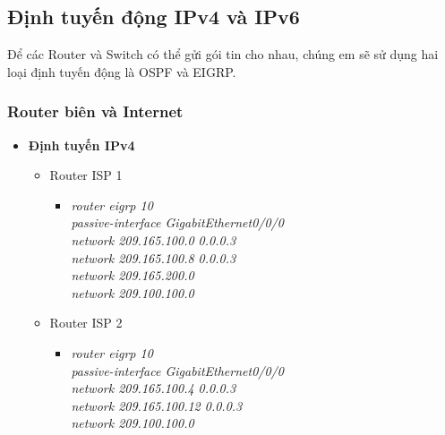 \documentclass[a4paper, 12pt]{article}
\begin{document}
\subsection{Định tuyến động IPv4 và IPv6}
\hspace*{1cm}Để các Router và Switch có thể gửi gói tin cho nhau, chúng em sẽ sử dụng hai loại định tuyến động là OSPF và EIGRP.\\
\subsubsection{Router biên và Internet}

\renewcommand{\labelitemi}{$\blacksquare$}
\renewcommand\labelitemii{$\nabla$}
\renewcommand\labelitemiii{$\square$}
\begin{itemize}
      \item \textbf{Định tuyến IPv4}
      
      \begin{itemize}
        \item Router ISP 1
        \begin{itemize}
          \item \textit{router eigrp 10\\
                    	passive-interface GigabitEthernet0/0/0\\
                    	network 209.165.100.0 0.0.0.3\\
                    	network 209.165.100.8 0.0.0.3\\
                    	network 209.165.200.0\\
                    	network 209.100.100.0\\}
        
        \end{itemize}
        \item Router ISP 2
        \begin{itemize}
         \item \textit{router eigrp 10\\
                    	passive-interface GigabitEthernet0/0/0\\
                    	network 209.165.100.4 0.0.0.3\\
                    	network 209.165.100.12 0.0.0.3\\
                    	network 209.100.100.0\\}
         

\end{itemize}
\end{itemize}
\end{itemize}
\end{document}
